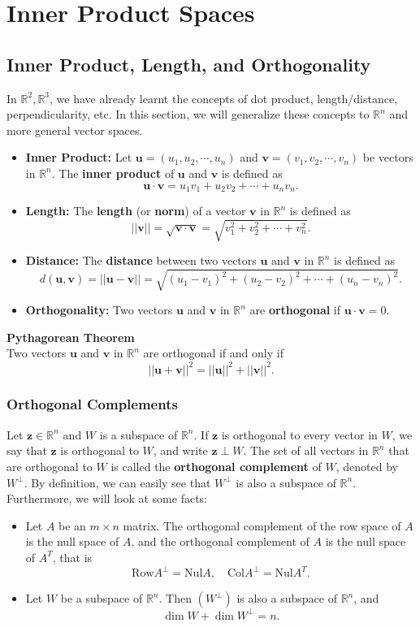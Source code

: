 \documentclass[10pt, a4paper]{article}
\newcommand{\R}{\mathbb{R}}
\newcommand{\vt}[1]{\mathbf{#1}}
\begin{document}
\section{Inner Product Spaces}
\subsection{Inner Product, Length, and Orthogonality}
\indent In $\R^2, \R^3$, we have already learnt the concepts of dot product, length/distance, perpendicularity, etc. In this section, we will generalize these concepts to $\R^n$ and more general vector spaces.
\begin{itemize}
    \item \textbf{Inner Product:} Let $\vt{u} = (u_1, u_2, \cdots, u_n)$ and $\vt{v} = (v_1, v_2, \cdots, v_n)$ be vectors in $\R^n$. The \textbf{inner product} of $\vt{u}$ and $\vt{v}$ is defined as\[ \vt{u} \cdot \vt{v} = u_1v_1 + u_2v_2 + \cdots + u_nv_n. \]
    \item \textbf{Length:} The \textbf{length} (or \textbf{norm}) of a vector $\vt{v}$ in $\R^n$ is defined as\[ ||\vt{v}|| = \sqrt{\vt{v} \cdot \vt{v}} = \sqrt{v_1^2 + v_2^2 + \cdots + v_n^2}. \] 
    \item \textbf{Distance:} The \textbf{distance} between two vectors $\vt{u}$ and $\vt{v}$ in $\R^n$ is defined as\[ d(\vt{u}, \vt{v}) = ||\vt{u} - \vt{v}|| = \sqrt{(u_1 - v_1)^2 + (u_2 - v_2)^2 + \cdots + (u_n - v_n)^2}. \]
    \item \textbf{Orthogonality:} Two vectors $\vt{u}$ and $\vt{v}$ in $\R^n$ are \textbf{orthogonal} if $\vt{u} \cdot \vt{v} = 0$.
\end{itemize}
\begin{proposition}
    \textbf{Pythagorean Theorem}\\ Two vectors $\vt{u}$ and $\vt{v}$ in $\R^n$ are orthogonal if and only if\[ ||\vt{u} + \vt{v}||^2 = ||\vt{u}||^2 + ||\vt{v}||^2. \]
\end{proposition}
\subsubsection*{Orthogonal Complements}
\indent Let $\vt{z}\in \R^n$ and $W$ is a subspace of $\R^n$. If $\vt{z}$ is orthogonal to every vector in $W$, we say that $\vt{z}$ is orthogonal to $W$, and write $\vt{z}\perp W$. The set of all vectors in $\R^n$ that are orthogonal to $W$ is called the \textbf{orthogonal complement} of $W$, denoted by $W^\perp$. 
By definition, we can easily see that $W^\perp$ is also a subspace of $\R^n$. Furthermore, we will look at some facts:
\begin{itemize}
    \item Let $A$ be an $m\times n$ matrix. The orthogonal complement of the row space of $A$ is the null space of $A$, and the orthogonal complement of $A$ is the null space of $A^T$, that is \[ \text{Row}A^\perp = \text{Nul}A, \quad \text{Col}A^\perp = \text{Nul}A^T. \]
    \item Let $W$ be a subspace of $\R^n$. Then $(W^\perp)$ is also a subspace of $\R^n$, and\[
    \operatorname*{dim} W + \operatorname*{dim} W^\perp = n.
    \]
\end{itemize}
\end{document}
